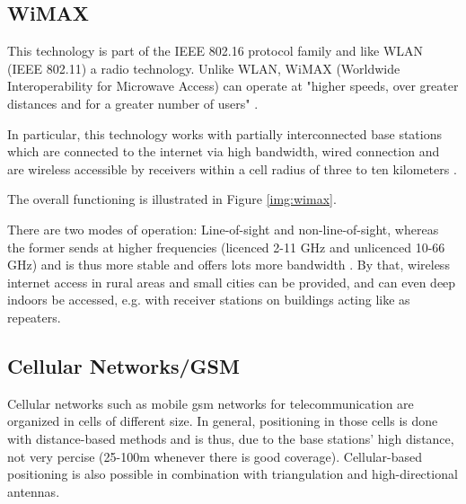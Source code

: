 
\subsection*{WiMAX}
This technology is part of the IEEE 802.16 protocol family and like WLAN (IEEE 802.11) a radio technology. Unlike WLAN, WiMAX (Worldwide Interoperability for Microwave Access) can operate at "higher speeds, over greater distances and for a greater number of users" \cite{wimax}.



In particular, this technology works with partially interconnected base stations which are connected to the internet via high bandwidth, wired connection and are wireless accessible by receivers within a cell radius of three to ten kilometers \cite{wimaxForumFAQ}.

The overall functioning is illustrated in Figure \ref{img:wimax}.


There are two modes of operation: Line-of-sight and non-line-of-sight, whereas the former sends at higher frequencies (licenced 2-11 GHz and unlicenced 10-66 GHz) and is thus more stable and offers lots more bandwidth \cite{wimax}.
By that, wireless internet access in rural areas and small cities can be provided, and can even deep indoors be accessed, e.g. with receiver stations on buildings acting like as repeaters.


\subsection*{Cellular Networks/GSM}

Cellular networks such as mobile \ac{gsm} networks for telecommunication are organized in cells of different size.
In general, positioning in those cells is done with distance-based methods and is thus, due to the base stations' high distance, not very percise (25-100m whenever there is good coverage).
Cellular-based positioning is also possible in combination with triangulation and high-directional antennas.

